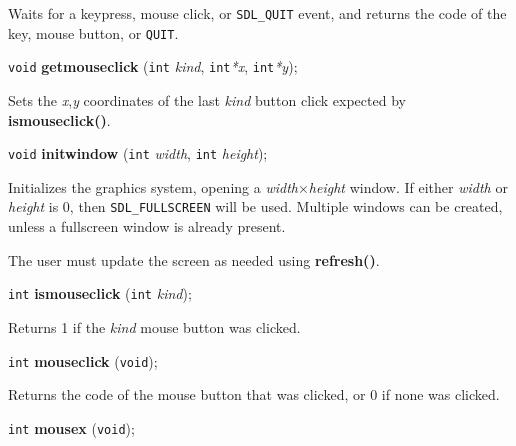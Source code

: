 \documentclass[a4paper,11pt]{article}
\newcommand{\V}{\texttt{void}}      %
\newcommand{\I}{\texttt{int}}       %
\newcommand{\func}[1]{\textbf{#1}}  %
\newcommand{\A}[1]{\emph{#1}}       %
\newcommand{\T}[1]{\texttt{#1}}     %
\newenvironment{bgi}
{ %
  \begin{snugshade}
}
{ %
  \end{snugshade}
}
\begin{document}
Waits for a keypress, mouse click, or \T{SDL\_QUIT} event, and returns
the code of the key, mouse button, or \T{QUIT}.








\begin{bgi}
\V{} \func{getmouseclick} (\I{} \A{kind}, \I{}\A{*x}, \I{}\A{*y});
\end{bgi}

Sets the \A{x},\A{y} coordinates of the last \A{kind} button click
expected by \func{ismouseclick()}.


\begin{bgi}
\V{} \func{initwindow} (\I{} \A{width}, \I{} \A{height});
\end{bgi}

Initializes the graphics system, opening a \A{width}$\times$\A{height}
window. If either \A{width} or \A{height} is 0, then
\T{SDL\-\_FULL\-SCREEN} will be used. Multiple windows can be created,
unless a fullscreen window is already present.

The user must update the screen as needed using \func{refresh()}.


\begin{bgi}
\I{} \func{ismouseclick} (\I{} \A{kind});
\end{bgi}

Returns 1 if the \A{kind} mouse button was clicked.


\begin{bgi}
\I{} \func{mouseclick} (\V{});
\end{bgi}

Returns the code of the mouse button that was clicked, or 0 if none
was clicked.


\begin{bgi}
\I{} \func{mousex} (\V{});
\end{bgi}
\end{document}

